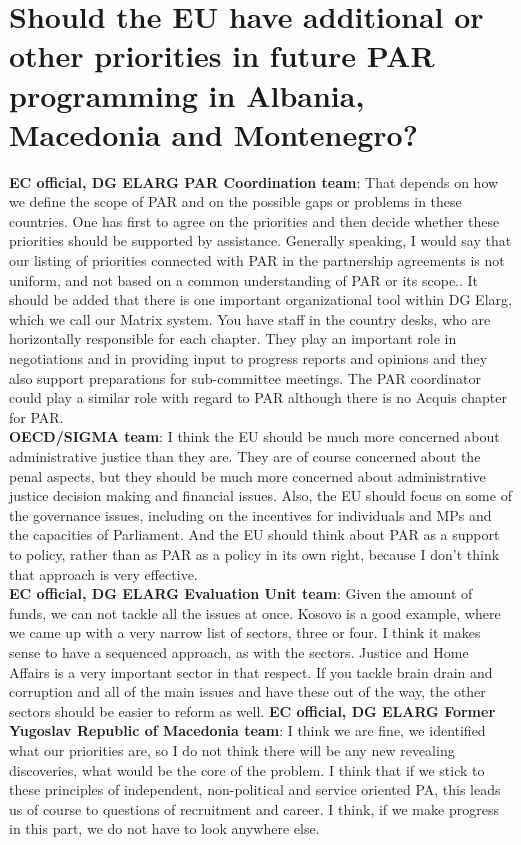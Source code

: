 \section{Should the EU have additional or other priorities in future PAR programming in Albania, Macedonia and Montenegro?}
\label{sec:montenegro3}
\textbf{EC official, DG ELARG PAR Coordination team}: That depends on  how we define the scope of PAR and  on the possible gaps or problems in these countries. One has first to agree on the priorities and then decide whether these priorities should be supported by assistance. Generally speaking, I would say that our listing  of priorities connected with PAR in the partnership agreements is not uniform, and  not based on a common understanding of PAR or its scope.. It should be added that there is one important organizational tool within DG Elarg, which we call our Matrix system. You have staff in the  country desks, who are horizontally responsible for each chapter. They play an important role in negotiations and in providing input to progress reports and opinions and they also support preparations for sub-committee meetings. The PAR coordinator could play a similar role with regard to PAR  although there is no Acquis chapter for PAR.\\
\textbf{OECD/SIGMA team}: I think the EU should be much more concerned about administrative justice than they are. They are of course concerned about the penal aspects, but they should be much more concerned about administrative justice decision making and financial issues. Also, the EU should focus on some of the governance issues, including on the incentives for individuals and MPs and the capacities of Parliament. And the EU should think about PAR as a support to policy, rather than as PAR as a policy in its own right, because I don't think that approach is very effective.\\
\textbf{EC official, DG ELARG Evaluation Unit team}: Given the amount of funds, we can not tackle all the issues at once. Kosovo is a good example, where we came up with a very narrow list of sectors, three or four. I think it makes sense to have a sequenced approach, as with the sectors. Justice and Home Affairs is a very important sector in that respect. If you tackle brain drain and corruption and all of the main issues and have these out of the way, the other sectors should be easier to reform as well.
\textbf{EC official, DG ELARG Former Yugoslav Republic of Macedonia team}: I think we are fine, we identified what our priorities are, so I do not think there will be any new revealing discoveries, what would be the core of the problem. I think that if we stick to these principles of independent, non-political and service oriented PA, this leads us of course to questions of recruitment and career. I think, if we make progress in this part, we do not have to look anywhere else.\\
